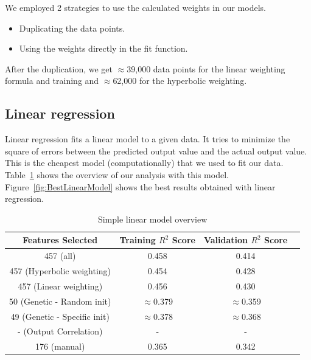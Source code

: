 \documentclass[11pt]{article}
\begin{document}
We employed 2 strategies to use the calculated weights in our models.

\begin{itemize}
\item Duplicating the data points.
\item Using the weights directly in the fit function.
\end{itemize}

After the duplication, we get $\approx$39,000 data points for the linear weighting formula and training and  $\approx$62,000 for the hyperbolic weighting.

\subsection{Linear regression}
Linear regression fits a linear model to a given data.
It tries to minimize the square of errors between the predicted output value and the actual output value.
This is the cheapest model (computationally) that we used to fit our data.
Table~\ref{table:1} shows the overview of our analysis with this model.
Figure~\ref{fig:BestLinearModel} shows the best results obtained with linear regression.

\begin{table} [h!]
\centering
 \begin{tabular}{ | c | c | c | c | }
\hline
\textbf{Features Selected} & \textbf{Training $R^2$ Score} & \textbf{Validation $R^2$ Score} \\ [0.5 ex]
\hline \hline
457 (all) & 0.458 & 0.414\\
457 (Hyperbolic weighting) & 0.454 & 0.428\\
457 (Linear weighting) & 0.456 & 0.430 \\
50 (Genetic - Random init)\footnotemark[1] & $\approx$0.379 & $\approx$0.359\\
49 (Genetic - Specific init)\footnotemark[1] & $\approx$0.378 & $\approx$0.368  \\
- (Output Correlation)\footnotemark[1] & - & -  \\ 
176 (manual) & 0.365  & 0.342  \\ [1ex]
\hline
\end{tabular}
\caption{Simple linear model overview}
\label {table:1}
\end{table}
\end{document}
